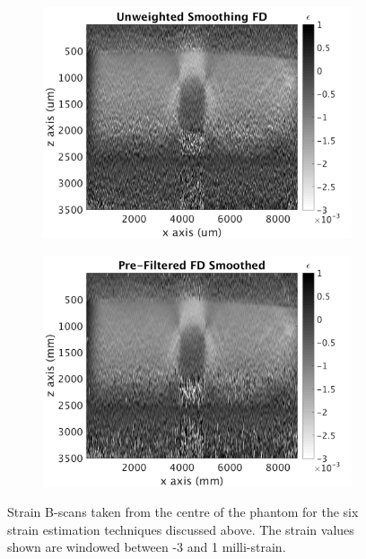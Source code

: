 \begin{figure}[hb!]
\begin{subfigure}{0.49\textwidth}
        \includegraphics[width=\textwidth]{figures/unweighted_fd}
	\end{subfigure}
    \begin{subfigure}{0.49\textwidth}
    	\centering
        \includegraphics[width=\textwidth]{figures/fd_smoothed}
    \end{subfigure}
    \label{bscan_images_1}
    \caption{Strain B-scans taken from the centre of the phantom for the six strain estimation techniques discussed above. The strain values shown are windowed between -3 and 1 milli-strain.}
\end{figure}


